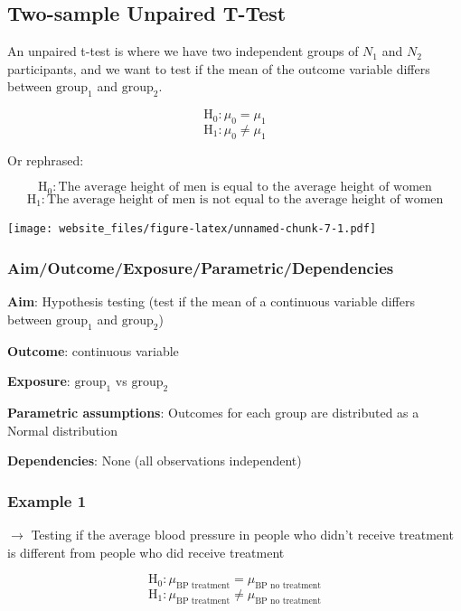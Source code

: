 \documentclass[12pt,]{article}
\begin{document}
\newpage

\subsection{Two-sample Unpaired
T-Test}\label{two-sample-unpaired-t-test}

An unpaired t-test is where we have two independent groups of \(N_1\)
and \(N_2\) participants, and we want to test if the mean of the outcome
variable differs between \(\text{group}_1\) and \(\text{group}_2\).

\[\text{H}_0: \mu_0 = \mu_1\] \[\text{H}_1: \mu_0 \ne \mu_1\]

Or rephrased:

\[\text{H}_0: \text{The average height of men is equal to the average height of women}\]
\[\text{H}_1: \text{The average height of men is not equal to the average height of women}\]

\texttt{[image: website\_files/figure-latex/unnamed-chunk-7-1.pdf]}

\subsubsection{Aim/Outcome/Exposure/Parametric/Dependencies}\label{aimoutcomeexposureparametricdependencies-3}

\textbf{Aim}: Hypothesis testing (test if the mean of a continuous
variable differs between \(\text{group}_1\) and \(\text{group}_2\))

\textbf{Outcome}: continuous variable

\textbf{Exposure}: \(\text{group}_1\) vs \(\text{group}_2\)

\textbf{Parametric assumptions}: Outcomes for each group are distributed
as a Normal distribution

\textbf{Dependencies}: None (all observations independent)

\newpage

\subsubsection{Example 1}\label{example-1-2}

\(\rightarrow\) Testing if the average blood pressure in people who
didn't receive treatment is different from people who did receive
treatment

\[\text{H}_0: \mu_{\text{BP treatment}} = \mu_{\text{BP no treatment}}\]
\[\text{H}_1: \mu_{\text{BP treatment}} \ne \mu_{\text{BP no treatment}}\]
\end{document}
